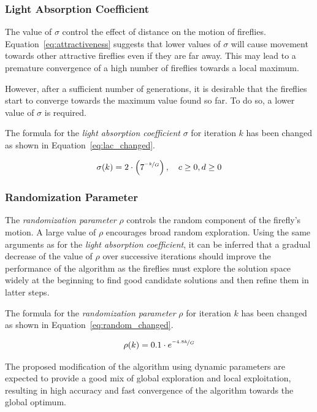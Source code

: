 \subsubsection{Light Absorption Coefficient}
\label{sec:5.lac}

The value of $\sigma$ control the effect of distance on the motion of fireflies.
Equation~\ref{eq:attractiveness} suggests that lower values of $\sigma$ will
cause movement towards other attractive fireflies even if they are far away.
This may lead to a premature convergence of a high number of fireflies
towards a local maximum.

However, after a sufficient number of generations, it is desirable
that the fireflies start to converge towards the maximum value found so far.
To do so, a lower value of $\sigma$ is required.

The formula for the \textit{light absorption coefficient} $\sigma$
for iteration $k$ has been changed as shown in Equation~\ref{eq:lac_changed}.

\begin{align}
\label{eq:lac_changed}
\sigma(k) = 2 \cdot \left(7^{\nicefrac{-k}{G}}\right),\quad c \ge 0, d \ge 0
\end{align}

\subsubsection{Randomization Parameter}
\label{sec:5.rp}

The \textit{randomization parameter} $\rho$ controls the random component
of the firefly's motion. A large value of $\rho$ encourages broad random exploration.
Using the same arguments as for the \textit{light absorption coefficient},
it can be inferred that a gradual decrease of the value of $\rho$ over
successive iterations should improve the performance of the algorithm
as the fireflies must explore the solution space widely at the beginning
to find good candidate solutions and then refine them in latter steps.

The formula for the \textit{randomization parameter} $\rho$
for iteration $k$ has been changed as shown in Equation~\ref{eq:random_changed}.

\begin{align}
\label{eq:random_changed}
\rho(k) = 0.1 \cdot e^{\nicefrac{-4.8k}{G}}
\end{align}

The proposed modification of the algorithm using dynamic parameters
are expected to provide a good mix of global exploration and local exploitation,
resulting in high accuracy and fast convergence of the algorithm towards
the global optimum.

